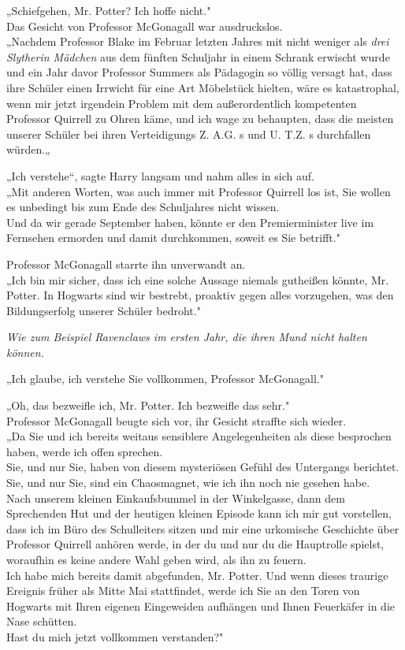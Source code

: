{„Schiefgehen, Mr. Potter? Ich hoffe nicht."\\ Das Gesicht von Professor McGonagall war ausdruckslos.\\ „Nachdem Professor Blake im Februar letzten Jahres mit nicht weniger als \emph{drei Slytherin Mädchen} aus dem fünften Schuljahr in einem Schrank erwischt wurde und ein Jahr davor Professor Summers als Pädagogin so völlig versagt hat, dass ihre Schüler einen Irrwicht für eine Art Möbelstück hielten, wäre es katastrophal, wenn mir jetzt irgendein Problem mit dem außerordentlich kompetenten Professor Quirrell zu Ohren käme, und ich wage zu behaupten, dass die meisten unserer Schüler bei ihren Verteidigungs Z. A.G. s und U. T.Z. s durchfallen würden.„

„Ich verstehe“, sagte Harry langsam und nahm alles in sich auf.\\ „Mit anderen Worten, was auch immer mit Professor Quirrell los ist, Sie wollen es unbedingt bis zum Ende des Schuljahres nicht wissen.\\ Und da wir gerade September haben, könnte er den Premierminister live im Fernsehen ermorden und damit durchkommen, soweit es Sie betrifft."

Professor McGonagall starrte ihn unverwandt an.\\ „Ich bin mir sicher, dass ich eine solche Aussage niemals gutheißen könnte, Mr. Potter. In Hogwarts sind wir bestrebt, proaktiv gegen alles vorzugehen, was den Bildungserfolg unserer Schüler bedroht."

\emph{Wie zum Beispiel Ravenclaws im ersten Jahr, die ihren Mund nicht halten können.}

„Ich glaube, ich verstehe Sie vollkommen, Professor McGonagall."

„Oh, das bezweifle ich, Mr. Potter. Ich bezweifle das sehr."\\ Professor McGonagall beugte sich vor, ihr Gesicht straffte sich wieder.\\ „Da Sie und ich bereits weitaus sensiblere Angelegenheiten als diese besprochen haben, werde ich offen sprechen.\\ Sie, und nur Sie, haben von diesem mysteriösen Gefühl des Untergangs berichtet. Sie, und nur Sie, sind ein Chaosmagnet, wie ich ihn noch nie gesehen habe.\\ Nach unserem kleinen Einkaufsbummel in der Winkelgasse, dann dem Sprechenden Hut und der heutigen kleinen Episode kann ich mir gut vorstellen, dass ich im Büro des Schulleiters sitzen und mir eine urkomische Geschichte über Professor Quirrell anhören werde, in der du und nur du die Hauptrolle spielst, woraufhin es keine andere Wahl geben wird, als ihn zu feuern.\\ Ich habe mich bereits damit abgefunden, Mr. Potter. Und wenn dieses traurige Ereignis früher als Mitte Mai stattfindet, werde ich Sie an den Toren von Hogwarts mit Ihren eigenen Eingeweiden aufhängen und Ihnen Feuerkäfer in die Nase schütten.\\ Hast du mich jetzt vollkommen verstanden?"

}
